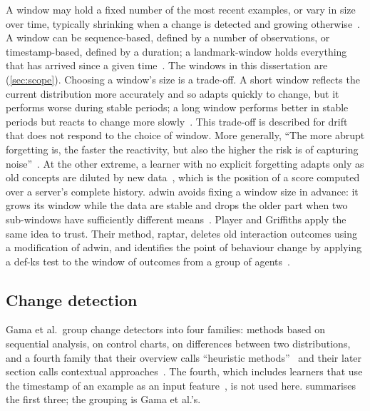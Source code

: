 A window may hold a fixed number of the most recent examples, or vary in size over time, typically shrinking when a change is detected and growing otherwise~\cite[p.~44:12]{Gama2014}. A window can be sequence-based, defined by a number of observations, or timestamp-based, defined by a duration; a \gls{landmark-window} holds everything that has arrived since a given time~\cite[p.~44:13]{Gama2014}. The windows in this dissertation are  (\cref{sec:scope}). Choosing a window's size is a trade-off. A short window reflects the current distribution more accurately and so adapts quickly to change, but it performs worse during stable periods; a long window performs better in stable periods but reacts to change more slowly~\cite[p.~44:12]{Gama2014}. This trade-off is described for drift that does not respond to the choice of window. More generally, \enquote{The more abrupt forgetting is, the faster the reactivity, but also the higher the risk is of capturing noise}~\cite[p.~44:13]{Gama2014}. At the other extreme, a learner with no explicit forgetting adapts only as old concepts are diluted by new data~\cite[p.~44:12]{Gama2014}, which is the position of a score computed over a server's complete history. \Gls{adwin} avoids fixing a window size in advance: it grows its window while the data are stable and drops the older part when two sub-windows have sufficiently different means~\cites[p.~443]{Bifet2007}[p.~44:18]{Gama2014}. Player and Griffiths apply the same idea to trust. Their method, \gls{raptar}, deletes old interaction outcomes using a modification of \gls{adwin}, and identifies the point of behaviour change by applying a \gls{def-ks} test to the window of outcomes from a group of agents~\cite[p.~2]{Player2020}.

\subsection{Change detection}\label{sec:change-detection}

Gama et al.\ group change detectors into four families: methods based on sequential analysis, on control charts, on differences between two distributions, and a fourth family that their overview calls \enquote{heuristic methods}~\cite[p.~44:14]{Gama2014} and their later section calls contextual approaches~\cite[p.~44:18]{Gama2014}. The fourth, which includes learners that use the timestamp of an example as an input feature~\cite[p.~44:18]{Gama2014}, is not used here.  summarises the first three; the grouping is Gama et al.'s.

